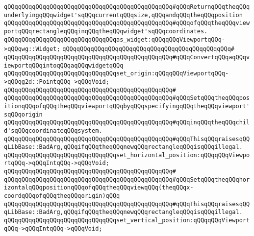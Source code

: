 \verb|qQQqqQQqqQQqqQQqqQQqqQQqqQQqqQQqqQQqqQQqqQQqqQQq#qQQqReturnqQQqtheqQQqunderlyingqQQqwidget'sqQQqcurrentqQQqsize,qQQqandqQQqtheqQQqposition|\newline
\verb|qQQqqQQqqQQqqQQqqQQqqQQqqQQqqQQqqQQqqQQqqQQqqQQq#qQQqofqQQqtheqQQqviewportqQQqrectangleqQQqinqQQqtheqQQqwidget'sqQQqcoordinates.|\newline
\newline
\verb|qQQqqQQqqQQqqQQqqQQqqQQqqQQqqQQqas_widget:qQQqqQQqViewportqQQq->qQQqwg::Widget;|\newline
\verb|qQQqqQQqqQQqqQQqqQQqqQQqqQQqqQQqqQQqqQQqqQQqqQQq#|\newline
\verb|qQQqqQQqqQQqqQQqqQQqqQQqqQQqqQQqqQQqqQQqqQQqqQQq#qQQqConvertqQQqaqQQqviewportqQQqintoqQQqaqQQqwidgetqQQq|\newline
\newline
\verb|qQQqqQQqqQQqqQQqqQQqqQQqqQQqqQQqset_origin:qQQqqQQqViewportqQQq->qQQqg2d::PointqQQq->qQQqVoid;|\newline
\verb|qQQqqQQqqQQqqQQqqQQqqQQqqQQqqQQqqQQqqQQqqQQqqQQq#|\newline
\verb|qQQqqQQqqQQqqQQqqQQqqQQqqQQqqQQqqQQqqQQqqQQqqQQq#qQQqSetqQQqtheqQQqpositionqQQqofqQQqtheqQQqviewportqQQqbyqQQqspecifyingqQQqtheqQQqviewport'sqQQqorigin|\newline
\verb|qQQqqQQqqQQqqQQqqQQqqQQqqQQqqQQqqQQqqQQqqQQqqQQq#qQQqinqQQqtheqQQqchild'sqQQqcoordinateqQQqsystem.|\newline
\verb|qQQqqQQqqQQqqQQqqQQqqQQqqQQqqQQqqQQqqQQqqQQqqQQq#qQQqThisqQQqraisesqQQqLibBase::BadArg,qQQqifqQQqtheqQQqnewqQQqrectangleqQQqisqQQqillegal.|\newline
\newline
\verb|qQQqqQQqqQQqqQQqqQQqqQQqqQQqqQQqset_horizontal_position:qQQqqQQqViewportqQQq->qQQqIntqQQq->qQQqVoid;|\newline
\verb|qQQqqQQqqQQqqQQqqQQqqQQqqQQqqQQqqQQqqQQqqQQqqQQq#|\newline
\verb|qQQqqQQqqQQqqQQqqQQqqQQqqQQqqQQqqQQqqQQqqQQqqQQq#qQQqSetqQQqtheqQQqhorizontalqQQqpositionqQQqofqQQqtheqQQqviewqQQq(theqQQqx-coordqQQqofqQQqtheqQQqorigin)qQQq|\newline
\verb|qQQqqQQqqQQqqQQqqQQqqQQqqQQqqQQqqQQqqQQqqQQqqQQq#qQQqThisqQQqraisesqQQqLibBase::BadArg,qQQqifqQQqtheqQQqnewqQQqrectangleqQQqisqQQqillegal.|\newline
\newline
\verb|qQQqqQQqqQQqqQQqqQQqqQQqqQQqqQQqset_vertical_position:qQQqqQQqViewportqQQq->qQQqIntqQQq->qQQqVoid;|\newline

